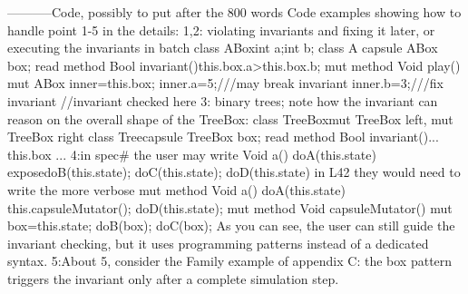 -----------Code, possibly to put after the 800 words
Code examples showing how to handle point 1-5 in the details:
1,2: violating invariants and fixing it later, or executing the invariants in batch
class ABox{int a;int b;}
class A{
 capsule ABox box;
 read method Bool invariant(){this.box.a>this.box.b;}
 mut method Void play(){
   mut ABox inner=this.box;
   inner.a=5;///may break invariant
   inner.b=3;///fix invariant
   //invariant checked here
   }}
3: binary trees; note how the invariant can reason on the overall shape of the TreeBox:
class TreeBox{mut TreeBox left, mut TreeBox right}
class Tree{capsule TreeBox box; 
  read method Bool invariant(){... this.box ...}}
4:in spec# the user may write 
  Void a() {doA(this.state) expose{doB(this.state); doC(this.state);} doD(this.state)}
in L42 they would need to write the more verbose
  mut method Void a() {doA(this.state) this.capsuleMutator(); doD(this.state);}
  mut method Void capsuleMutator() {mut box=this.state; doB(box); doC(box);}
As you can see, the user can still guide the invariant checking, but it uses programming patterns
instead of a dedicated syntax.
5:About 5, consider the Family example of appendix C: the box pattern triggers the
invariant only after a complete simulation step.
